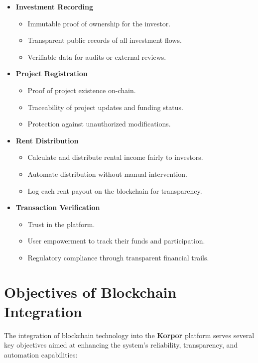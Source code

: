 \begin{itemize}
    \item \textbf{Investment Recording}
    \begin{itemize}
        \item Immutable proof of ownership for the investor.
        \item Transparent public records of all investment flows.
        \item Verifiable data for audits or external reviews.
    \end{itemize}

    \item \textbf{Project Registration}
    \begin{itemize}
        \item Proof of project existence on-chain.
        \item Traceability of project updates and funding status.
        \item Protection against unauthorized modifications.
    \end{itemize}

    \item \textbf{Rent Distribution}
    \begin{itemize}
        \item Calculate and distribute rental income fairly to investors.
        \item Automate distribution without manual intervention.
        \item Log each rent payout on the blockchain for transparency.
    \end{itemize}

    \item \textbf{Transaction Verification}
    \begin{itemize}
        \item Trust in the platform.
        \item User empowerment to track their funds and participation.
        \item Regulatory compliance through transparent financial trails.
    \end{itemize}
\end{itemize}

\section{Objectives of Blockchain Integration}

The integration of blockchain technology into the \textbf{\textcolor{primary}{Korpor}} platform serves several key objectives aimed at enhancing the system's reliability, transparency, and automation capabilities:


